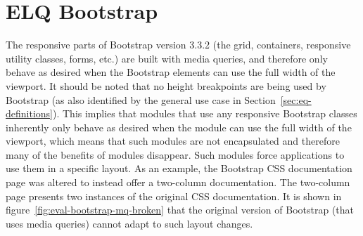 \documentclass[a4paper,11pt]{kth-mag}
\begin{document}
    \section{ELQ Bootstrap}\label{sec:eval-bootstrap}
      The \gls{responsive} parts of \gls{Bootstrap} version 3.3.2 (the grid, containers, \gls{responsive} utility classes, forms, etc.) are built with \gls{media queries}, and therefore only behave as desired when the \gls{Bootstrap} \glspl{element} can use the full width of the \gls{viewport}.
      It should be noted that no height breakpoints are being used by \gls{Bootstrap} (as also identified by the general use case in Section~\ref{sec:eq-definitions}).
      This implies that modules that use any \gls{responsive} \gls{Bootstrap} classes inherently only behave as desired when the module can use the full width of the \gls{viewport}, which means that such modules are not \gls{encapsulated} and therefore many of the benefits of modules disappear.
      Such modules force applications to use them in a specific layout.
      As an example, the \gls{Bootstrap} \gls{CSS} documentation page was altered to instead offer a two-column documentation.
      The two-column page presents two instances of the original \gls{CSS} documentation.
      It is shown in figure~\ref{fig:eval-bootstrap-mq-broken} that the original version of \gls{Bootstrap} (that uses \gls{media queries}) cannot adapt to such layout changes.
\end{document}
